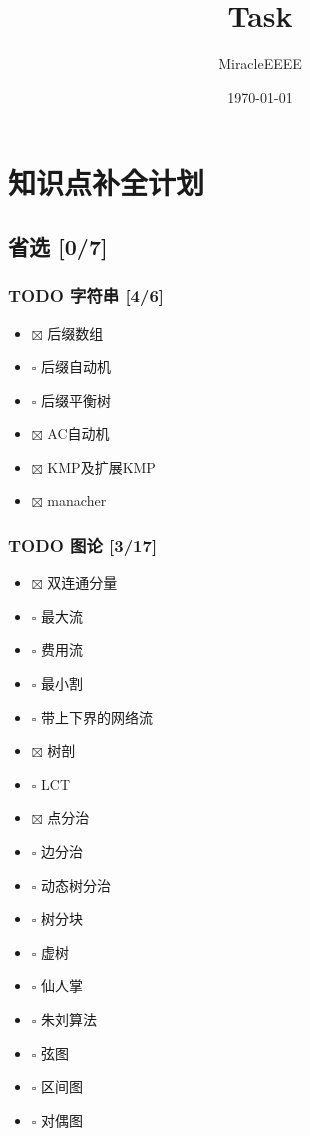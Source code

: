 \documentclass[11pt]{article}
\author{MiracleEEEE}
\date{\today}
\title{Task}
\begin{document}
\maketitle
\tableofcontents


\section{知识点补全计划}
\label{sec-1}
\subsection{省选 [0/7]}
\label{sec-1-1}
\subsubsection{{\bfseries\sffamily TODO} 字符串 [4/6]}
\label{sec-1-1-1}
\begin{itemize}
\item $\boxtimes$ 后缀数组
\item $\square$ 后缀自动机
\item $\square$ 后缀平衡树
\item $\boxtimes$ AC自动机
\item $\boxtimes$ KMP及扩展KMP
\item $\boxtimes$ manacher
\end{itemize}
\subsubsection{{\bfseries\sffamily TODO} 图论 [3/17]}
\label{sec-1-1-2}

\begin{itemize}
\item $\boxtimes$ 双连通分量
\item $\square$ 最大流
\item $\square$ 费用流
\item $\square$ 最小割
\item $\square$ 带上下界的网络流
\item $\boxtimes$ 树剖
\item $\square$ LCT
\item $\boxtimes$ 点分治
\item $\square$ 边分治
\item $\square$ 动态树分治
\item $\square$ 树分块
\item $\square$ 虚树
\item $\square$ 仙人掌
\item $\square$ 朱刘算法
\item $\square$ 弦图
\item $\square$ 区间图
\item $\square$ 对偶图
\end{itemize}
\end{document}

